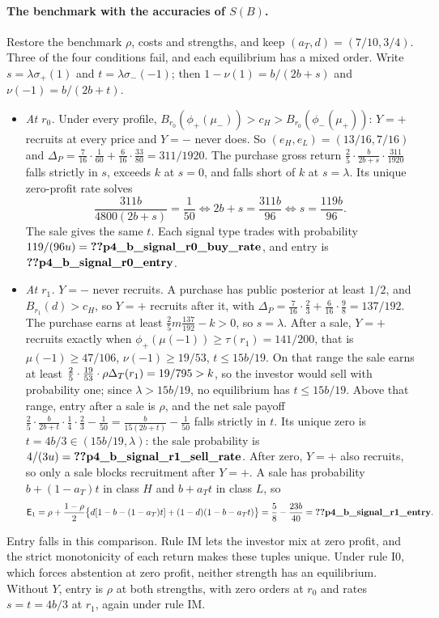 \paragraph{The benchmark with the accuracies of \(S(B)\).}
Restore the benchmark \(\rho\), costs and strengths, and keep \((a_T,d)=(7/10,3/4)\). Three of the four conditions
fail, and each equilibrium has a mixed order. Write \(s=\lambda\sigma_+(1)\) and \(t=\lambda\sigma_-(-1)\); then
\(1-\nu(1)=b/(2b+s)\) and \(\nu(-1)=b/(2b+t)\).
\begin{itemize}[leftmargin=2em]
\item \emph{At \(r_0\).} Under every profile, \(B_{r_0}(\phi_+(\mu_-))>c_H>B_{r_0}(\phi_-(\mu_+))\): \(Y=+\) recruits at
every price and \(Y=-\) never does. So \((e_H,e_L)=(13/16,7/16)\) and
\(\Delta_P=\tfrac7{16}\cdot\tfrac1{60}+\tfrac6{16}\cdot\tfrac{33}{80}=311/1920\). The purchase gross return
\(\tfrac25\cdot\tfrac{b}{2b+s}\cdot\tfrac{311}{1920}\) falls strictly in \(s\), exceeds \(k\) at \(s=0\), and falls
short of \(k\) at \(s=\lambda\). Its unique zero-profit rate solves
\[
\frac{311b}{4800(2b+s)}=\frac1{50}\iff 2b+s=\frac{311b}{96}\iff s=\frac{119b}{96}.
\]
The sale gives the same \(t\). Each signal type trades with probability \(119/(96u)=\reg{p4_b_signal_r0_buy_rate}\),
and entry is \(\reg{p4_b_signal_r0_entry}\).
\item \emph{At \(r_1\).} \(Y=-\) never recruits. A purchase has public posterior at least \(1/2\), and
\(B_{r_1}(d)>c_H\), so \(Y=+\) recruits after it, with \(\Delta_P=\tfrac7{16}\cdot\tfrac23+\tfrac6{16}\cdot\tfrac98=137/192\).
The purchase earns at least \(\tfrac25m\tfrac{137}{192}-k>0\), so \(s=\lambda\). After a sale, \(Y=+\) recruits
exactly when \(\phi_+(\mu(-1))\ge\tau(r_1)=141/200\), that is \(\mu(-1)\ge47/106\), \(\nu(-1)\ge19/53\), \(t\le15b/19\).
On that range the sale earns at least \(\tfrac25\cdot\tfrac{19}{53}\cdot\rho\Delta_T(r_1)=19/795>k\), so the investor
would sell with probability one; since \(\lambda>15b/19\), no equilibrium has \(t\le15b/19\). Above that range, entry
after a sale is \(\rho\), and the net sale payoff \(\tfrac25\cdot\tfrac{b}{2b+t}\cdot\tfrac14\cdot\tfrac23-\tfrac1{50}
=\tfrac{b}{15(2b+t)}-\tfrac1{50}\) falls strictly in \(t\). Its unique zero is \(t=4b/3\in(15b/19,\lambda)\): the sale
probability is \(4/(3u)=\reg{p4_b_signal_r1_sell_rate}\). After zero, \(Y=+\) also recruits, so only a sale blocks
recruitment after \(Y=+\). A sale has probability \(b+(1-a_T)t\) in class \(H\) and \(b+a_Tt\) in class \(L\), so
\[
\Ent_1=\rho+\frac{1-\rho}2\bigl\{d[1-b-(1-a_T)t]+(1-d)(1-b-a_Tt)\bigr\}=\frac58-\frac{23b}{40}=\reg{p4_b_signal_r1_entry}.
\]
\end{itemize}
Entry falls in this comparison. Rule IM lets the investor mix at zero profit, and the strict monotonicity of each
return makes these tuples unique. Under rule I0, which forces abstention at zero profit, neither strength has an
equilibrium. Without \(Y\), entry is \(\rho\) at both strengths, with zero orders at \(r_0\) and rates \(s=t=4b/3\) at
\(r_1\), again under rule IM.

